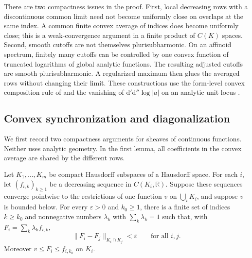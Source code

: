 There are two compactness issues in the proof. First, local decreasing rows with a discontinuous common limit need not become uniformly close on overlaps at the same index. A common finite convex average of indices does become uniformly close; this is a weak-convergence argument in a finite product of $C(K)$ spaces. Second, smooth cutoffs are not themselves plurisubharmonic. On an affinoid spectrum, finitely many cutoffs can be controlled by one convex function of truncated logarithms of global analytic functions. The resulting adjusted cutoffs are smooth plurisubharmonic. A regularized maximum then glues the averaged rows without changing their limit. These constructions use the form-level convex composition rule of \cite[Proposition~8.2.1]{CLD25} and the vanishing of $\mathrm{d}'\mathrm{d}''\log|a|$ on an analytic unit locus \cite[Lemma~16.7.4]{CLD25}.

\subsection{Convex synchronization and diagonalization}
\label{sec:supplied-p071a-synchronization}

We first record two compactness arguments for sheaves of continuous functions. Neither uses analytic geometry. In the first lemma, all coefficients in the convex average are shared by the different rows.

\begin{lemma}
\label{lem:supplied-p071a-convex-synchronization}
Let $K_1,\ldots,K_m$ be compact Hausdorff subspaces of a Hausdorff space. For each $i$, let $(f_{i,k})_{k\geq1}$ be a decreasing sequence in $C(K_i,\mathbb{R})$. Suppose these sequences converge pointwise to the restrictions of one function $v$ on $\bigcup_i K_i$, and suppose $v$ is bounded below. For every $\varepsilon>0$ and $k_0\geq1$, there is a finite set of indices $k\geq k_0$ and nonnegative numbers $\lambda_k$ with $\sum_k\lambda_k=1$ such that, with $F_i=\sum_k\lambda_k f_{i,k}$,
\[
\lVert F_i-F_j\rVert_{K_i\cap K_j}<\varepsilon
\qquad\text{for all }i,j.
\]
Moreover $v\leq F_i\leq f_{i,k_0}$ on $K_i$.
\end{lemma}

